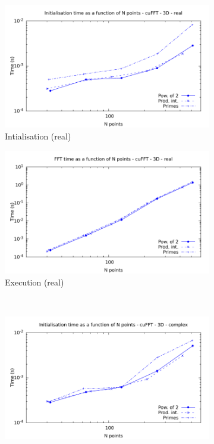 \documentclass[12pt, a4paper]{article}
\begin{document}
\begin{figure}[H]
\captionsetup{width=0.8\linewidth}
\centering
\begin{subfigure}{.5\textwidth}
\centering
\includegraphics[width=.9\linewidth]{graphs/fft-cuda-3d-pow2-r-init.pdf}
\caption{Intialisation (real)}
\label{FFTCUDA3DRI}
\end{subfigure}%
\begin{subfigure}{.5\textwidth}
\centering
\includegraphics[width=.9\linewidth]{graphs/fft-cuda-3d-pow2-r-exec.pdf}
\caption{Execution (real)}
\label{FFTCUDA3DRE}
\end{subfigure}\\
\begin{subfigure}{.5\textwidth}
\centering
\includegraphics[width=.9\linewidth]{graphs/fft-cuda-3d-pow2-c-init.pdf}

\end{subfigure}
\end{figure}
\end{document}
